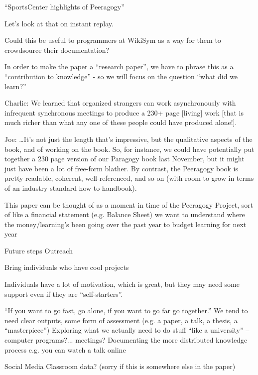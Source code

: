 \documentclass{acm_proc_article-sp}
\begin{document}
``SportsCenter highlights of Peeragogy''

Let's look at that on instant replay.

Could this be useful to programmers at WikiSym as a way for them to crowdsource their documentation?

In order to make the paper a ``research paper'', we have to phrase
this as a ``contribution to knowledge'' - so we will focus on the
question ``what did we learn?''

Charlie: We learned that organized strangers can work asynchronously
with infrequent synchronous meetings to produce a 230+ page [living]
work [that is much richer than what any one of these people could have
  produced alone!].

Joe: \ldots It's not just the length that's impressive, but the
qualitative aspects of the book, and of working on the book. So, for
instance, we could have potentially put together a 230 page version of
our Paragogy book last November, but it might just have been a lot of
free-form blather. By contrast, the Peeragogy book is pretty readable,
coherent, well-referenced, and so on (with room to grow in terms of an industry standard how to handbook).


This paper can be thought of as a moment in time of the Peeragogy Project, sort of like a financial statement (e.g. Balance Sheet) we want to understand where the money/learning's been going over the past year to budget learning for next year

Future steps
Outreach

Bring individuals who have cool projects

Individuals have a lot of motivation, which is great, but they may need some support even if they are ``self-starters''.

``If you want to go fast, go alone, if you want to go far go together.''
We tend to need clear outputs, some form of assessment (e.g. a paper,
a talk, a thesis, a ``masterpiece'')
Exploring what we actually need to do stuff ``like a university'' -- computer programs?... meetings?
Documenting the more distributed knowledge process
e.g. you can watch a talk online

Social Media Classroom data? (sorry if this is somewhere else in the paper)

%
\end{document}
